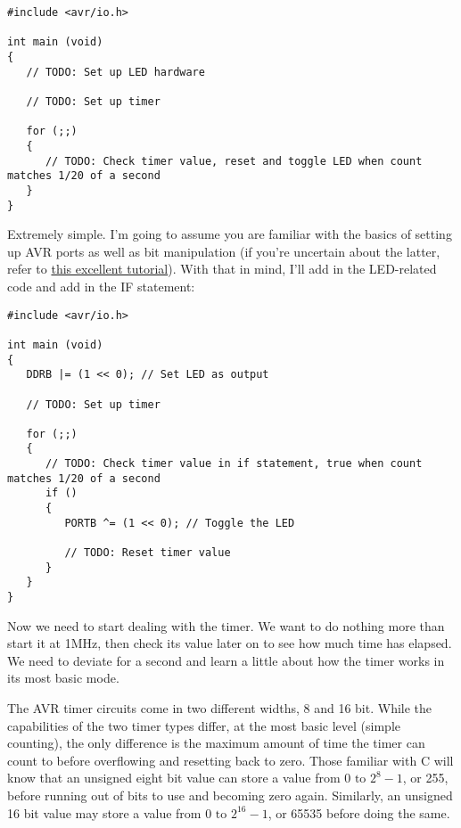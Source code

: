 \documentclass[a4paper,oneside,notitlepage]{book}
\begin{document}
\begin{center}
\begin{lstlisting}
#include <avr/io.h>

int main (void)
{
   // TODO: Set up LED hardware

   // TODO: Set up timer

   for (;;)
   {
      // TODO: Check timer value, reset and toggle LED when count matches 1/20 of a second
   }
}
\end{lstlisting}
\end{center}

Extremely simple. I'm going to assume you are familiar with the basics of setting up AVR ports as well as bit manipulation (if you're uncertain about the latter, refer to \href{http://www.avrfreaks.net/index.php?name=PNphpBB2&file=viewtopic&t=37871}{this excellent tutorial}). With that in mind, I'll add in the LED-related code and add in the IF statement:

\begin{center}
\begin{lstlisting}
#include <avr/io.h>

int main (void)
{
   DDRB |= (1 << 0); // Set LED as output

   // TODO: Set up timer

   for (;;)
   {
      // TODO: Check timer value in if statement, true when count matches 1/20 of a second
      if ()
      {
         PORTB ^= (1 << 0); // Toggle the LED

         // TODO: Reset timer value
      }
   }
}
\end{lstlisting}
\end{center}

Now we need to start dealing with the timer. We want to do nothing more than start it at 1MHz, then check its value later on to see how much time has elapsed. We need to deviate for a second and learn a little about how the timer works in its most basic mode.

The AVR timer circuits come in two different widths, 8 and 16 bit. While the capabilities of the two timer types differ, at the most basic level (simple counting), the only difference is the maximum amount of time the timer can count to before overflowing and resetting back to zero. Those familiar with C will know that an unsigned eight bit value can store a value from \(0 \text{ to } 2^{8}-1\), or 255, before running out of bits to use and becoming zero again. Similarly, an unsigned 16 bit value may store a value from \(0 \text{ to } 2^{16}-1\), or 65535 before doing the same.
\end{document}
